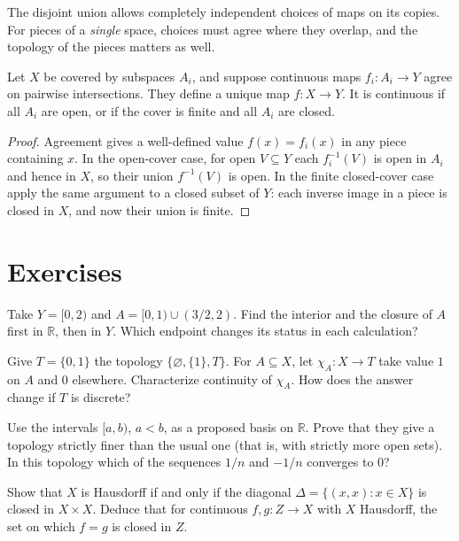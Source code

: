 The disjoint union allows completely independent choices of maps on its copies. For pieces of a \emph{single} space, choices must agree where they overlap, and the topology of the pieces matters as well.

\begin{proposition}\label{f:top-pasting}
Let $X$ be covered by subspaces $A_i$, and suppose continuous maps $f_i:A_i\to Y$ agree on pairwise intersections. They define a unique map $f:X\to Y$. It is continuous if all $A_i$ are open, or if the cover is finite and all $A_i$ are closed.
\end{proposition}
\begin{proof}
Agreement gives a well-defined value $f(x)=f_i(x)$ in any piece containing $x$. In the open-cover case, for open $V\subseteq Y$ each $f_i^{-1}(V)$ is open in $A_i$ and hence in $X$, so their union $f^{-1}(V)$ is open. In the finite closed-cover case apply the same argument to a closed subset of $Y$: each inverse image in a piece is closed in $X$, and now their union is finite.
\end{proof}

\section{Exercises}

\begin{exercise}\label{f:top-ex-relative}
Take $Y=[0,2)$ and $A=[0,1)\cup(3/2,2)$. Find the interior and the closure of $A$ first in $\mathbb R$, then in $Y$. Which endpoint changes its status in each calculation?
\end{exercise}
\begin{exercise}\label{f:top-ex-indicator}
Give $T=\{0,1\}$ the topology $\{\varnothing,\{1\},T\}$. For $A\subseteq X$, let $\chi_A:X\to T$ take value $1$ on $A$ and $0$ elsewhere. Characterize continuity of $\chi_A$. How does the answer change if $T$ is discrete?
\end{exercise}
\begin{exercise}\label{f:top-ex-basis}
Use the intervals $[a,b)$, $a<b$, as a proposed basis on $\mathbb R$. Prove that they give a topology strictly finer than the usual one (that is, with strictly more open sets). In this topology which of the sequences $1/n$ and $-1/n$ converges to $0$?
\end{exercise}
\begin{exercise}\label{f:top-ex-diagonal}
Show that $X$ is Hausdorff if and only if the diagonal $\Delta=\{(x,x):x\in X\}$ is closed in $X\times X$. Deduce that for continuous $f,g:Z\to X$ with $X$ Hausdorff, the set on which $f=g$ is closed in $Z$.
\end{exercise}

